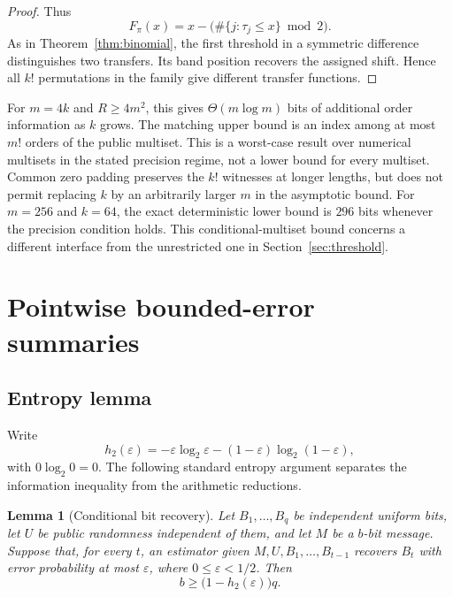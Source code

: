 \documentclass[11pt,reqno]{amsart}
\newtheorem{lemma}[theorem]{Lemma}
\theoremstyle{definition}
\theoremstyle{remark}
\numberwithin{equation}{section}
\begin{document}
\begin{proof}
Thus
\begin{equation}
\label{eq:permutation-transfer}
 F_\pi(x)=x-\bigl(\#\{j:\tau_j\leq x\}\bmod 2\bigr).
\end{equation}
As in Theorem~\ref{thm:binomial}, the first threshold in a symmetric
difference distinguishes two transfers. Its band position recovers
the assigned shift. Hence all $k!$ permutations in the family give
different transfer functions.
\end{proof}

For $m=4k$ and $R\geq 4m^2$, this gives $\Theta(m\log m)$ bits of
additional order information as $k$ grows. The matching upper bound
is an index among at most $m!$ orders of the public multiset. This is
a worst-case result over numerical multisets in the stated precision
regime, not a lower bound for every multiset. Common zero padding
preserves the $k!$ witnesses at longer lengths, but does not permit
replacing $k$ by an arbitrarily larger $m$ in the asymptotic bound.
For $m=256$ and $k=64$, the exact deterministic lower bound is $296$
bits whenever the precision condition holds. This conditional-multiset
bound concerns a different interface from the unrestricted one in
Section~\ref{sec:threshold}.

\section{Pointwise bounded-error summaries}
\label{sec:random}

\subsection{Entropy lemma}

Write
\[
 h_2(\varepsilon)=-\varepsilon\log_2\varepsilon
 -(1-\varepsilon)\log_2(1-\varepsilon),
\]
with $0\log_2 0=0$. The following standard entropy argument separates
the information inequality from the arithmetic reductions.

\begin{lemma}[Conditional bit recovery]
\label{lem:entropy}
Let $B_1,\ldots,B_q$ be independent uniform bits, let $U$ be public
randomness independent of them, and let $M$ be a $b$-bit message.
Suppose that, for every $t$, an estimator given
$M,U,B_1,\ldots,B_{t-1}$ recovers $B_t$ with error probability at
most $\varepsilon$, where $0\leq\varepsilon<1/2$. Then
\begin{equation}
\label{eq:entropy-bound}
 b\geq\bigl(1-h_2(\varepsilon)\bigr)q.
\end{equation}
\end{lemma}
\end{document}

